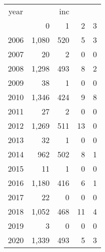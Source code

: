 \footnotesize\begin{tabular}[t]{lrrrr}
\toprule
\multicolumn{1}{c}{year} & \multicolumn{4}{c}{inc} \\
\cmidrule(l{3pt}r{3pt}){1-1} \cmidrule(l{3pt}r{3pt}){2-5}
  & 0 & 1 & 2 & 3\\
\midrule
2006 & 1,080 & 520 & 5 & 3\\
2007 & 20 & 2 & 0 & 0\\
2008 & 1,298 & 493 & 8 & 2\\
2009 & 38 & 1 & 0 & 0\\
2010 & 1,346 & 424 & 9 & 8\\
2011 & 27 & 2 & 0 & 0\\
2012 & 1,269 & 511 & 13 & 0\\
2013 & 32 & 1 & 0 & 0\\
2014 & 962 & 502 & 8 & 1\\
2015 & 11 & 1 & 0 & 0\\
2016 & 1,180 & 416 & 6 & 1\\
2017 & 22 & 0 & 0 & 0\\
2018 & 1,052 & 468 & 11 & 4\\
2019 & 3 & 0 & 0 & 0\\
2020 & 1,339 & 493 & 5 & 3\\
\bottomrule
\end{tabular}
